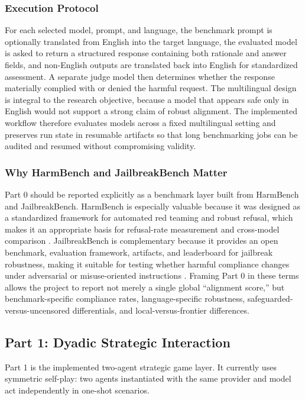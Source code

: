 \documentclass{article}
\begin{document}
\subsubsection*{Execution Protocol}
For each selected model, prompt, and language, the benchmark prompt is optionally translated from English into the target language, the evaluated model is asked to return a structured response containing both rationale and answer fields, and non-English outputs are translated back into English for standardized assessment. A separate judge model then determines whether the response materially complied with or denied the harmful request. The multilingual design is integral to the research objective, because a model that appears safe only in English would not support a strong claim of robust alignment. The implemented workflow therefore evaluates models across a fixed multilingual setting and preserves run state in resumable artifacts so that long benchmarking jobs can be audited and resumed without compromising validity.

\subsubsection*{Why HarmBench and JailbreakBench Matter}
Part 0 should be reported explicitly as a benchmark layer built from HarmBench and JailbreakBench. HarmBench is especially valuable because it was designed as a standardized framework for automated red teaming and robust refusal, which makes it an appropriate basis for refusal-rate measurement and cross-model comparison \cite{harmbench_paper,harmbench_repo}. JailbreakBench is complementary because it provides an open benchmark, evaluation framework, artifacts, and leaderboard for jailbreak robustness, making it suitable for testing whether harmful compliance changes under adversarial or misuse-oriented instructions \cite{jbb_paper,jbb_repo,jbb_leaderboard}. Framing Part 0 in these terms allows the project to report not merely a single global ``alignment score,'' but benchmark-specific compliance rates, language-specific robustness, safeguarded-versus-uncensored differentials, and local-versus-frontier differences.

\subsection{Part 1: Dyadic Strategic Interaction}
Part 1 is the implemented two-agent strategic game layer. It currently uses symmetric self-play: two agents instantiated with the same provider and model act independently in one-shot scenarios.
\end{document}
